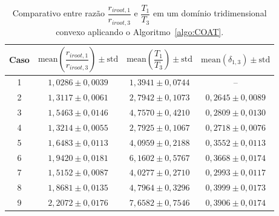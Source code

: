 \begin{table}[!htb]
  \centering
  \captiondelim{: }
  \caption{Comparativo entre razão $\dfrac{r_{iroot, 1}}{r_{iroot, 3}}$ e $\dfrac{T_1}{T_3}$ 
  em um domínio tridimensional convexo aplicando o Algoritmo~\ref{algo:COAT}.}
\begin{tabular}{|c|c|c|c|}
\hline
Caso & $\textrm{mean}\left(\dfrac{r_{iroot, 1}}{r_{iroot, 3}}\right)\pm \textrm{std}$ & $\textrm{mean}\left(\dfrac{T_1}{T_3}\right) \pm \textrm{std}$ & $\textrm{mean}\left(\delta_{1,3}\right) \pm \textrm{std}$ \\ \hline
1 & $1,0286 \pm 0,0039$ & $1,3941 \pm 0,0744$ & -- \\ \hline
2 & $1,3117 \pm 0,0061$ & $2,7942 \pm 0,1073$ & $0,2645 \pm 0,0089$ \\ \hline
3 & $1,5463 \pm 0,0146$ & $4,7570 \pm 0,4210$ & $0,2809 \pm 0,0130$ \\ \hline
4 & $1,3214 \pm 0,0055$ & $2,7925 \pm 0,1067$ & $0,2718 \pm 0,0076$ \\ \hline
5 & $1,6483 \pm 0,0113$ & $4,0959 \pm 0,2188$ & $0,3552 \pm 0,0113$ \\ \hline
6 & $1,9420 \pm 0,0181$ & $6,1602 \pm 0,5767$ & $0,3668 \pm 0,0174$ \\ \hline
7 & $1,5152 \pm 0,0087$ & $4,0277 \pm 0,2710$ & $0,2993 \pm 0,0117$ \\ \hline
8 & $1,8681 \pm 0,0135$ & $4,7964 \pm 0,3296$ & $0,3999 \pm 0,0173$ \\ \hline
9 & $2,2072 \pm 0,0176$ & $7,6582 \pm 0,7546$ & $0,3906 \pm 0,0174$ \\ \hline
\end{tabular}
  \label{tab:resultados-lei-alometrica-floresta-coat-3arvores-3d-parte2}
\end{table}

